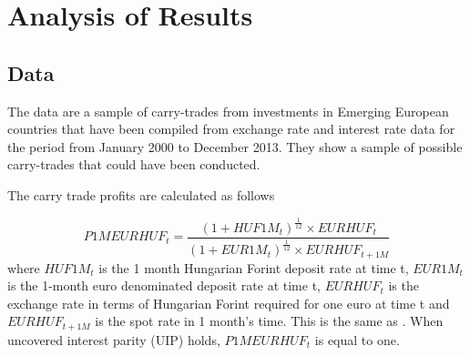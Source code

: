 \documentclass[12pt, a4paper, oneside]{article}\usepackage[]{graphicx}\usepackage[]{color}
\begin{document}






\section{Analysis of Results}
\subsection{Data}
The data are a sample of carry-trades from investments in Emerging European countries that have been compiled from exchange rate and interest rate data for the period from January 2000 to December 2013.  They show a sample of possible carry-trades that could have been conducted. 

The carry trade profits are calculated as follows

\begin{equation}\label{eqref:carryprofit}
P1MEURHUF_t = \frac{(1 + HUF1M_t)^{\frac{1}{12}} \times EURHUF_t }{(1 + EUR1M_t)^{\frac{1}{12}} \times EURHUF_{t+1M}}
\end{equation}
where $HUF1M_t$ is the 1 month Hungarian Forint deposit rate at time t, $EUR1M_t$ is the 1-month euro denominated deposit rate at time t, $EURHUF_t$ is the exchange rate in terms of  Hungarian Forint required for one euro at time t and  $EURHUF_{t+1M}$ is the spot rate in 1 month's time.  This is the same as \citep{BrunnermeierCarry}. When uncovered interest parity (UIP) holds, $P1MEURHUF_t$ is equal to one.  
\end{document}
